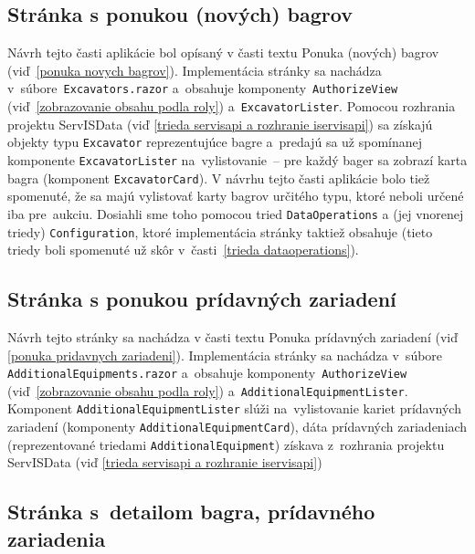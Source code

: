 \subsection{Stránka s ponukou (nových) bagrov}

Návrh tejto časti aplikácie bol opísaný v časti textu Ponuka (nových) bagrov (viď~\ref{ponuka novych bagrov}). Implementácia stránky sa nachádza v~súbore~\verb|Excavators.razor| a~obsahuje komponenty~\verb|AuthorizeView| (viď~\ref{zobrazovanie obsahu podla roly}) a~\verb|ExcavatorLister|. Pomocou rozhrania projektu ServISData (viď \ref{trieda servisapi a rozhranie iservisapi}) sa získajú objekty typu \verb|Excavator| reprezentujúce bagre a~predajú sa už spomínanej komponente \verb|ExcavatorLister| na~vylistovanie~-- pre každý bager sa zobrazí karta bagra (komponent \verb|ExcavatorCard|). V návrhu tejto časti aplikácie bolo tiež spomenuté, že sa majú vylistovať karty bagrov určitého typu, ktoré neboli určené iba pre~aukciu. Dosiahli sme toho pomocou tried \verb|DataOperations| a (jej vnorenej triedy) \verb|Configuration|, ktoré implementácia stránky taktiež obsahuje (tieto triedy boli spomenuté už skôr v~časti~\ref{trieda dataoperations}).

\subsection{Stránka s ponukou prídavných zariadení}

Návrh tejto stránky sa nachádza v časti textu Ponuka prídavných zariadení (viď \ref{ponuka pridavnych zariadeni}). Implementácia stránky sa nachádza v~súbore \linebreak\verb|AdditionalEquipments.razor| a~obsahuje komponenty~\verb|AuthorizeView| (viď~\ref{zobrazovanie obsahu podla roly}) a~\verb|AdditionalEquipmentLister|. Komponent \linebreak\verb|AdditionalEquipmentLister| slúži na~vylistovanie kariet prídavných zariadení (komponenty \verb|AdditionalEquipmentCard|), dáta prídavných zariadeniach (reprezentované triedami \verb|AdditionalEquipment|) získava z~rozhrania projektu ServISData (viď \ref{trieda servisapi a rozhranie iservisapi})

\subsection{Stránka s~detailom bagra, prídavného zariadenia}

